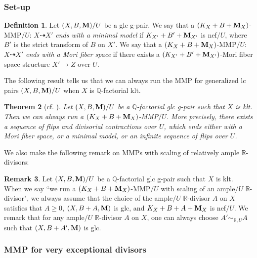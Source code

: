 \documentclass[11pt]{amsart}
\numberwithin{equation}{section}
\newcommand{\Mm}{{\bf{M}}}
\newcommand{\Qq}{\mathbb{Q}}
\newcommand{\Rr}{\mathbb{R}}
\newtheorem{thm}{Theorem}[section]
\theoremstyle{definition}
\newtheorem{defn}[thm]{Definition}
\theoremstyle{definition}
\newtheorem{rem}[thm]{Remark}
\theoremstyle{definition}
\begin{document}
\subsubsection{Set-up} 

\begin{defn}
Let $(X,B,\Mm)/U$ be a glc g-pair. We say that a $(K_X+B+\Mm_X)$-MMP$/U$: $X\dashrightarrow X'$ \emph{ends with a minimal model} if $K_{X'}+B'+\Mm_{X'}$ is nef$/U$, where $B'$ is the strict transform of $B$ on $X'$. We say that  a $(K_X+B+\Mm_X)$-MMP$/U$: $X\dashrightarrow X'$ \emph{ends with a Mori fiber space} if there exists a $(K_{X'}+B'+\Mm_{X'})$-Mori fiber space structure $X'\rightarrow Z$ over $U$. 
\end{defn}


The following result tells us that we can always run the MMP for generalized lc pairs $(X,B,\Mm)/U$ when $X$ is $\Qq$-factorial klt.
\begin{thm}[{cf. \cite[Lemma 3.5]{HL18}}]\label{thm: can run mmp for gklt pair}
Let $(X,B,\Mm)/U$ be a $\Qq$-factorial glc g-pair such that $X$ is klt. Then we can always run a $(K_X+B+\Mm_X)$-MMP$/U$. More precisely, there exists a sequence of flips and divisorial contractions over $U$, which ends either with a Mori fiber space, or a minimal model, or an infinite sequence of flips over $U$.
\end{thm}



We also make the following remark on MMPs with scaling of relatively ample $\Rr$-divisors:

\begin{rem}
Let $(X,B,\Mm)/U$ be a $\Qq$-factorial glc g-pair such that $X$ is klt. When we say ``we run a $(K_X+B+\Mm_X)$-MMP$/U$ with scaling of an ample$/U$ $\Rr$-divisor", we always assume that the choice of the ample$/U$ $\Rr$-divisor $A$ on $X$ satisfies that $A\geq 0$, $(X,B+A,\Mm)$ is glc, and $K_X+B+A+\Mm_X$ is nef$/U$. We remark that for any ample$/U$ $\Rr$-divisor $A$ on $X$, one can always choose $A'\sim_{\Rr,U}A$ such that $(X,B+A',\Mm)$ is glc.
\end{rem}








\subsubsection{MMP for very exceptional divisors}
\end{document}
